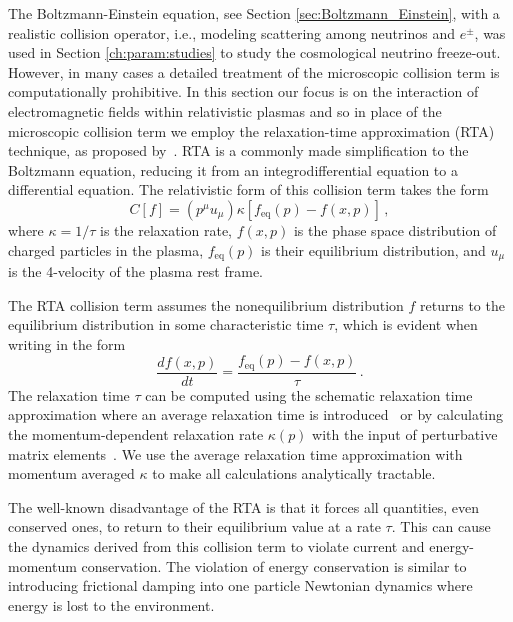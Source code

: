 The Boltzmann-Einstein equation, see Section \ref{sec:Boltzmann_Einstein}, with a realistic collision operator, i.e., modeling scattering among neutrinos and $e^\pm$, was used in Section \ref{ch:param:studies} to  study the cosmological neutrino freeze-out. However, in many cases a detailed treatment of the microscopic collision term  is computationally prohibitive.  In this section our focus is on the interaction of electromagnetic fields within relativistic plasmas and so in place of the microscopic collision term we employ the relaxation-time approximation (RTA) technique, as proposed by~\cite{Anderson:1974nyl}. RTA is a commonly made simplification to the Boltzmann equation, reducing it from an integrodifferential equation to a differential equation. The relativistic form of this collision term takes the form
\begin{equation}\label{eq:lincoll}
C[f] = (p^\mu u_\mu) \kappa [ f_\mathrm{eq}(p) - f(x,p) ] \,,
\end{equation}
where $\kappa=1/\tau$ is the relaxation rate, $f(x,p)$ is the phase space distribution of charged particles in the plasma, $f_\mathrm{eq}(p)$ is their equilibrium distribution, and $u_\mu$ is the 4-velocity of the plasma rest frame.

The RTA collision term assumes the nonequilibrium distribution $f$ returns to the equilibrium distribution in some characteristic time $\tau$, which is evident when writing  in the form
\begin{equation}
    \frac{d f(x,p)}{dt} = \frac{f_\mathrm{eq}(p) - f(x,p) }{\tau}\,.
\end{equation}
The relaxation time $\tau$ can be computed using the schematic relaxation time approximation where an average relaxation time is introduced~\cite{Mrowczynski:1988xu,Satow:2014lia} or by calculating the momentum-dependent relaxation rate $\kappa(p)$ with the input of perturbative matrix elements~\cite{Ahonen:1996nq}. We use the average relaxation time approximation with momentum averaged $\kappa$ to make all calculations analytically tractable.

The well-known disadvantage of the RTA is that it forces all quantities, even conserved ones, to return to their equilibrium value at a rate $\tau$. This can cause the dynamics derived from this collision term to violate current and energy-momentum conservation. The violation of energy conservation is similar to introducing frictional damping into one particle Newtonian dynamics where energy is lost to the environment.

